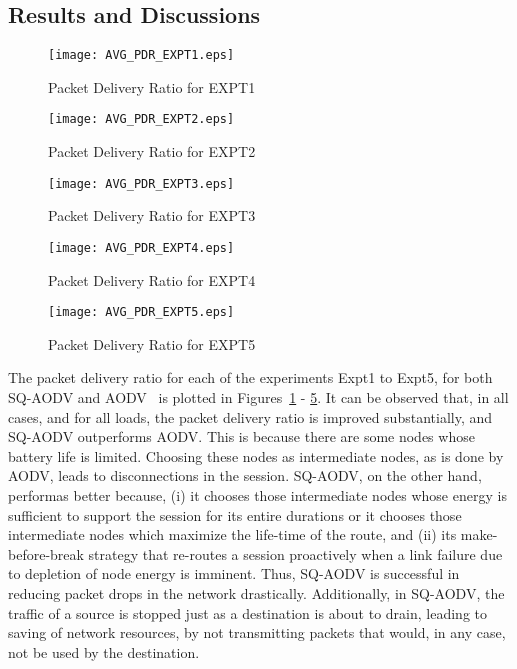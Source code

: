 \subsection{Results and Discussions}

\begin{figure}[htbp]
	\centering
	\texttt{[image: AVG\_PDR\_EXPT1.eps]}
	\caption{Packet Delivery Ratio for EXPT1}
	\label{fig52}
\end{figure}


\begin{figure}[htbp]
	\centering
	\texttt{[image: AVG\_PDR\_EXPT2.eps]}
	\caption{Packet Delivery Ratio for EXPT2}
	\label{fig53}
\end{figure}


\begin{figure}[htbp]
	\centering
	\texttt{[image: AVG\_PDR\_EXPT3.eps]}
	\caption{Packet Delivery Ratio for EXPT3}
	\label{fig54}
\end{figure}


\begin{figure}[htbp]
	\centering
	\texttt{[image: AVG\_PDR\_EXPT4.eps]}
	\caption{Packet Delivery Ratio for EXPT4}
	\label{fig55}
\end{figure}


\begin{figure}[htbp]
	\centering
	\texttt{[image: AVG\_PDR\_EXPT5.eps]}
	\caption{Packet Delivery Ratio for EXPT5}
	\label{fig56}
\end{figure}

The packet delivery ratio for each of the experiments Expt1 to Expt5, for both SQ-AODV and AODV~\cite{aodv} is plotted in Figures~\ref{fig52} - \ref{fig56}. It can be observed that, in all cases, and for all loads, the packet delivery ratio is improved substantially, and SQ-AODV outperforms AODV. This is because there are some nodes whose battery life is limited. Choosing these nodes as intermediate nodes, as is done by AODV, leads to disconnections in the session. SQ-AODV, on the other hand, performas better because, (i) it chooses those intermediate nodes whose energy is sufficient to support the session for its entire durations or it chooses those intermediate nodes which maximize the life-time of the route, and (ii) its make-before-break strategy that re-routes a session proactively when a  link failure due to depletion of node energy is imminent. Thus, SQ-AODV is successful in reducing packet drops in the network drastically. Additionally, in SQ-AODV, the traffic of a source is stopped just as a destination is about to drain, leading to saving of network resources, by not transmitting packets that would, in any case, not be used by the destination.



